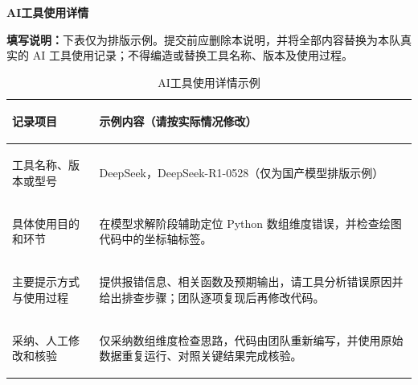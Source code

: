 \documentclass[12pt,a4paper]{ctexart}
\begin{document}
\begin{center}
	{\bfseries AI工具使用详情}
\end{center}

\noindent\textbf{填写说明：}下表仅为排版示例。提交前应删除本说明，并将全部内容替换为本队真实的
AI 工具使用记录；不得编造或替换工具名称、版本及使用过程。

\begin{table}[htbp]
	\centering
	\caption{AI工具使用详情示例}
	\begin{tabularx}{\textwidth}{>{\bfseries\raggedright\arraybackslash}p{3.6cm}X}
		\toprule
		记录项目 & 示例内容（请按实际情况修改） \\
		\midrule
		工具名称、版本或型号 & DeepSeek，DeepSeek-R1-0528（仅为国产模型排版示例） \\
		具体使用目的和环节 & 在模型求解阶段辅助定位 Python 数组维度错误，并检查绘图代码中的坐标轴标签。 \\
		主要提示方式与使用过程 & 提供报错信息、相关函数及预期输出，请工具分析错误原因并给出排查步骤；团队逐项复现后再修改代码。 \\
		采纳、人工修改和核验 & 仅采纳数组维度检查思路，代码由团队重新编写，并使用原始数据重复运行、对照关键结果完成核验。 \\
		\bottomrule
	\end{tabularx}
\end{table}
\end{document}
